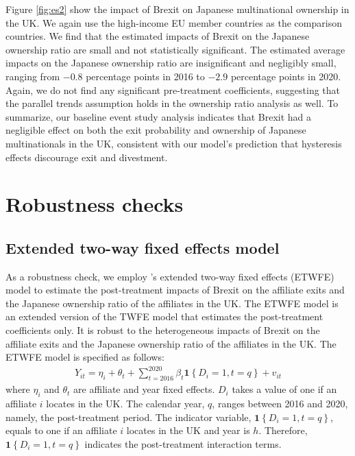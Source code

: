 \documentclass[preprint,11pt,authoryear]{elsarticle}
\begin{document}
Figure \ref{fig:es2} show the impact of Brexit on Japanese multinational ownership in the UK.
We again use the high-income EU member countries as the comparison countries.
We find that the estimated impacts of Brexit on the Japanese ownership ratio are small and not statistically significant.
The estimated average impacts on the Japanese ownership ratio are insignificant and negligibly small, ranging from $-0.8$ percentage points in 2016 to $-2.9$ percentage points in 2020.
Again, we do not find any significant pre-treatment coefficients, suggesting that the parallel trends assumption holds in the ownership ratio analysis as well. 
To summarize, our baseline event study analysis indicates that Brexit had a negligible effect on both the exit probability and ownership of Japanese multinationals in the UK, consistent with our model’s prediction that hysteresis effects discourage exit and divestment.





\section{Robustness checks}\label{sec:robustness}

\subsection{Extended two-way fixed effects model}\label{sec:etwfe}

As a robustness check, we employ \cite{wooldridge2021two}'s extended two-way fixed effects (ETWFE) model to estimate the post-treatment impacts of Brexit on the affiliate exits and the Japanese ownership ratio of the affiliates in the UK.
The ETWFE model is an extended version of the TWFE model that estimates the post-treatment coefficients only.
It is robust to the heterogeneous impacts of Brexit on the affiliate exits and the Japanese ownership ratio of the affiliates in the UK.
The ETWFE model is specified as follows:
\begin{align}\label{eq:ETWFE}
Y_{i t}=
\eta_{i}
+
\theta_{t}
+
\sum_{t=2016}^{2020} 
\beta_{t} 
\mathbf{1}\left\{D_{i}=1, t=q \right\}
+
v_{i t}
\end{align}
where $\eta_{i}$ and $\theta_{t}$ are affiliate and year fixed effects.
$D_{i}$ takes a value of one if an affiliate $i$ locates in the UK.
The calendar year, $q$, ranges between 2016 and 2020, namely, the post-treatment period.
The indicator variable, $\mathbf{1}\left\{D_{i}=1, t=q\right\}$, equals to one if an affiliate $i$ locates in the UK and year is $h$. 
Therefore, $\mathbf{1}\left\{D_{i}=1, t=q\right\}$ indicates the post-treatment interaction terms.
\end{document}
